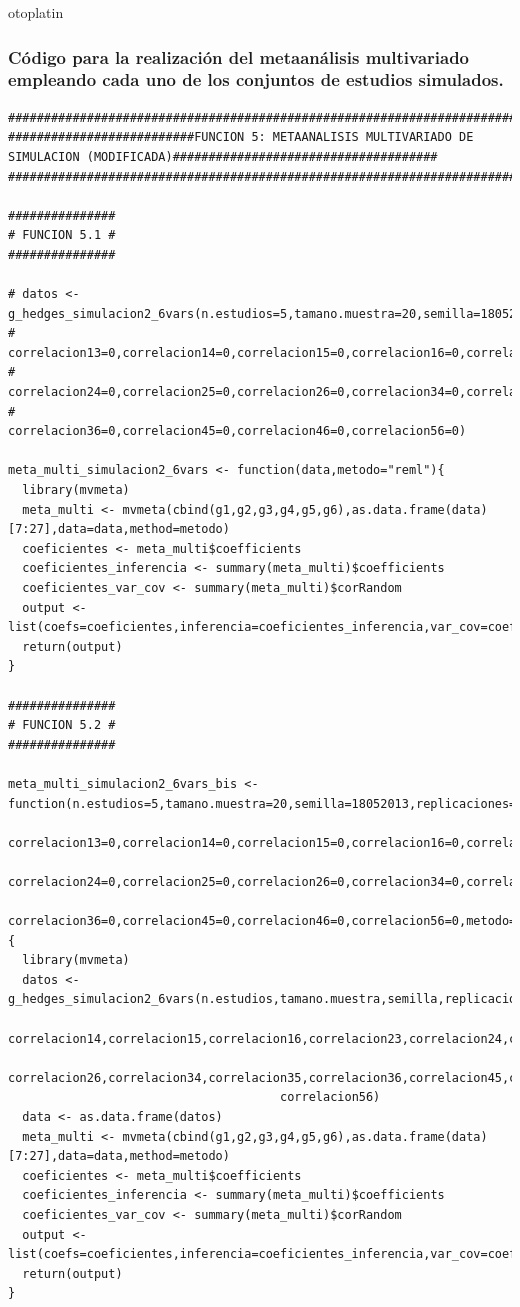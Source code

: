 otoplatin\documentclass[a4paper,openright,12pt]{report}
\begin{document}
\subsubsection{Código para la realización del metaanálisis multivariado empleando cada uno de los conjuntos de estudios simulados.}
{\tiny
\begin{verbatim}
##############################################################################################################################
##########################FUNCION 5: METAANALISIS MULTIVARIADO DE SIMULACION (MODIFICADA)#####################################
##############################################################################################################################

###############
# FUNCION 5.1 #
###############

# datos <- g_hedges_simulacion2_6vars(n.estudios=5,tamano.muestra=20,semilla=18052013,replicaciones=5,correlacion12=0,
#                                     correlacion13=0,correlacion14=0,correlacion15=0,correlacion16=0,correlacion23=0,
#                                     correlacion24=0,correlacion25=0,correlacion26=0,correlacion34=0,correlacion35=0,
#                                     correlacion36=0,correlacion45=0,correlacion46=0,correlacion56=0)

meta_multi_simulacion2_6vars <- function(data,metodo="reml"){
  library(mvmeta)
  meta_multi <- mvmeta(cbind(g1,g2,g3,g4,g5,g6),as.data.frame(data)[7:27],data=data,method=metodo)
  coeficientes <- meta_multi$coefficients
  coeficientes_inferencia <- summary(meta_multi)$coefficients
  coeficientes_var_cov <- summary(meta_multi)$corRandom
  output <- list(coefs=coeficientes,inferencia=coeficientes_inferencia,var_cov=coeficientes_var_cov)
  return(output)
}

###############
# FUNCION 5.2 #
###############

meta_multi_simulacion2_6vars_bis <- function(n.estudios=5,tamano.muestra=20,semilla=18052013,replicaciones=5,correlacion12=0,
                                             correlacion13=0,correlacion14=0,correlacion15=0,correlacion16=0,correlacion23=0,
                                             correlacion24=0,correlacion25=0,correlacion26=0,correlacion34=0,correlacion35=0,
                                             correlacion36=0,correlacion45=0,correlacion46=0,correlacion56=0,metodo="reml"){
  library(mvmeta)
  datos <- g_hedges_simulacion2_6vars(n.estudios,tamano.muestra,semilla,replicaciones,correlacion12,correlacion13,
                                      correlacion14,correlacion15,correlacion16,correlacion23,correlacion24,correlacion25,
                                      correlacion26,correlacion34,correlacion35,correlacion36,correlacion45,correlacion46,
                                      correlacion56)
  data <- as.data.frame(datos)
  meta_multi <- mvmeta(cbind(g1,g2,g3,g4,g5,g6),as.data.frame(data)[7:27],data=data,method=metodo)
  coeficientes <- meta_multi$coefficients
  coeficientes_inferencia <- summary(meta_multi)$coefficients
  coeficientes_var_cov <- summary(meta_multi)$corRandom
  output <- list(coefs=coeficientes,inferencia=coeficientes_inferencia,var_cov=coeficientes_var_cov)
  return(output)  
}


\end{verbatim}}
\end{document}
